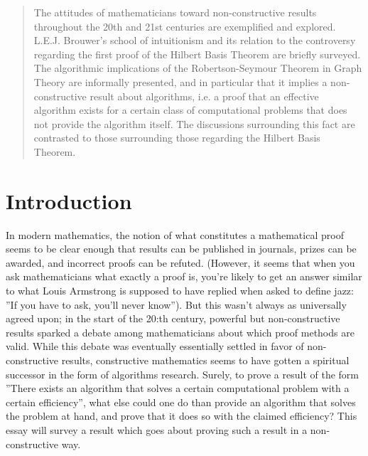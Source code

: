 \maketitle

\thispagestyle{plain}

\begin{abstract}
  The attitudes of mathematicians toward non-constructive results throughout the 20th and 21st centuries are exemplified and explored. L.E.J. Brouwer's school of intuitionism and its relation to the controversy regarding the first proof of the Hilbert Basis Theorem are briefly surveyed. The algorithmic implications of the Robertson-Seymour Theorem in Graph Theory are informally presented, and in particular that it implies a non-constructive result about algorithms, i.e. a proof that an effective algorithm exists for a certain class of computational problems that does not provide the algorithm itself. The discussions surrounding this fact are contrasted to those surrounding those regarding the Hilbert Basis Theorem.
\end{abstract}



\section{Introduction}
In modern mathematics, the notion of what constitutes a mathematical proof seems to be clear enough that results can be published in journals, prizes can be awarded, and incorrect proofs can be refuted. (However, it seems that when you ask mathematicians what exactly\cite{seymourGraphMinorsXIII1995} \cite{vanattenLuitzenEgbertusJan2020} a proof is, you're likely to get an answer similar to what Louis Armstrong is supposed to have replied when asked to define jazz: ''If you have to ask, you'll never know''). But this wasn't always as universally agreed upon; in the start of the 20:th century, powerful but non-constructive results sparked a debate among mathematicians about which proof methods are valid. While this debate was eventually essentially settled in favor of non-constructive results, constructive mathematics seems to have gotten a spiritual successor in the form of algorithms research. Surely, to prove a result of the form ''There exists an algorithm that solves a certain computational problem with a certain efficiency'', what else could one do than provide an algorithm that solves the problem at hand, and prove that it does so with the claimed efficiency? This essay will survey a result which goes about proving such a result in a non-constructive way.

